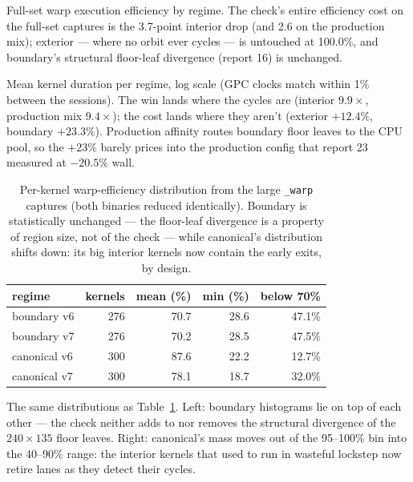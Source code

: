 \documentclass[
	english,
	letterpaper, oneside
]{article}
\begin{document}
            {Full-set warp execution efficiency by regime. The check's
             entire efficiency cost on the full-set captures is the 3.7-point
             interior drop (and 2.6 on the production mix); exterior ---
             where no orbit ever cycles --- is untouched at 100.0\%, and
             boundary's structural floor-leaf divergence (report 16) is
             unchanged. \label{fig:warpeff}}

            {Mean kernel duration per regime, log scale (GPC clocks match
             within 1\% between the sessions). The win lands where the
             cycles are (interior $9.9\times$, production mix $9.4\times$);
             the cost lands where they aren't (exterior $+12.4\%$, boundary
             $+23.3\%$). Production affinity routes boundary floor leaves to
             the CPU pool, so the $+23\%$ barely prices into the production
             config that report 23 measured at $-20.5\%$ wall.
             \label{fig:duration}}

\begin{table}[H]
\centering
\caption{Per-kernel warp-efficiency distribution from the large
\texttt{\_warp} captures (both binaries reduced identically). Boundary is
statistically unchanged --- the floor-leaf divergence is a property of
region size, not of the check --- while canonical's distribution shifts
down: its big interior kernels now contain the early exits, by design.}
\label{tab:dist}
\small
\begin{tabular}{lrrrr}
\toprule
regime & kernels & mean (\%) & min (\%) & below 70\% \\
\midrule
boundary v6  & 276 & 70.7 & 28.6 & 47.1\% \\
boundary v7  & 276 & 70.2 & 28.5 & 47.5\% \\
\midrule
canonical v6 & 300 & 87.6 & 22.2 & 12.7\% \\
canonical v7 & 300 & 78.1 & 18.7 & 32.0\% \\
\bottomrule
\end{tabular}
\end{table}

            {The same distributions as Table~\ref{tab:dist}. Left: boundary
             histograms lie on top of each other --- the check neither adds
             to nor removes the structural divergence of the $240\times135$
             floor leaves. Right: canonical's mass moves out of the
             95--100\% bin into the 40--90\% range: the interior kernels
             that used to run in wasteful lockstep now retire lanes as they
             detect their cycles. \label{fig:dist}}
\end{document}
